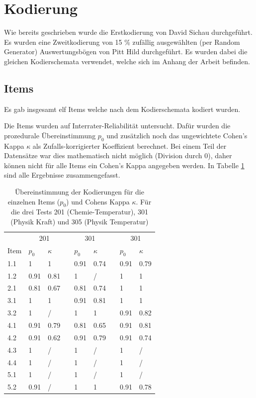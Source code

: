 \section{Kodierung}

Wie bereits geschrieben wurde die Erstkodierung von David Sichau durchgeführt. Es wurden eine Zweitkodierung von  15 \% zufällig ausgewählten (per Random Generator) Auswertungsbögen von Pitt Hild  durchgeführt. Es wurden dabei die gleichen Kodierschemata verwendet, welche sich im Anhang der Arbeit befinden. %

\subsection{Items}
Es gab insgesamt elf Items welche nach dem Kodierschemata kodiert wurden.

Die Items wurden auf Interrater-Reliabilität untersucht. Dafür wurden die prozedurale Übereinstimmung $p_0$ und zusätzlich noch das ungewichtete Cohen's Kappa $\kappa$ als Zufalls-korrigierter Koeffizient berechnet. Bei einem Teil der Datensätze war dies mathematisch nicht möglich (Division durch 0), daher können nicht für alle Items ein Cohen's Kappa angegeben werden. In Tabelle \ref{tab:CohenKappa} sind alle Ergebnisse zusammengefasst.



\begin{table}[htbp]
  \centering
\begin{tabular}{@{}lllllllll@{}}
\toprule   &  \multicolumn{2}{c}{201} &&  \multicolumn{2}{c}{301}  && \multicolumn{2}{c}{301}\\
 \cmidrule{2-3}  \cmidrule{5-6} \cmidrule{8-9}
Item  & $p_0$ & $\kappa$ &&  $p_0$ & $\kappa$ &&  $p_0$ & $\kappa$\\
\midrule
 1.1 & 1 & 1  && 0.91 & 0.74 && 0.91 & 0.79 \\ 
 1.2 & 0.91 & 0.81  && 1 & /  && 1 & 1 \\ 
 2.1 & 0.81 & 0.67  && 0.81 & 0.74  && 1 & 1\\ 
 3.1 & 1 & 1  && 0.91 & 0.81  && 1 & 1\\ 
 3.2 & 1 & /  && 1 & 1  && 0.91 & 0.82\\ 
 4.1 & 0.91 & 0.79 && 0.81 & 0.65  && 0.91 & 0.81 \\ 
 4.2 & 0.91 & 0.62 && 0.91 & 0.79  && 0.91 & 0.74 \\ 
 4.3 & 1 & /  && 1 & /  && 1 & / \\ 
 4.4 & 1 & /  && 1 & /  && 1 & / \\ 
 5.1 & 1 & /  && 1 & /  && 1 & / \\ 
 5.2 & 0.91 & /  && 1 & 1  && 0.91 & 0.78 \\ 

\bottomrule

\end{tabular} 
  \caption{Übereinstimmung der Kodierungen für die einzelnen Items ($p_0$) und Cohens Kappa $\kappa$. Für die drei Tests 201 (Chemie-Temperatur), 301 (Physik Kraft) und 305 (Physik Temperatur)}
  \label{tab:CohenKappa}
\end{table}

